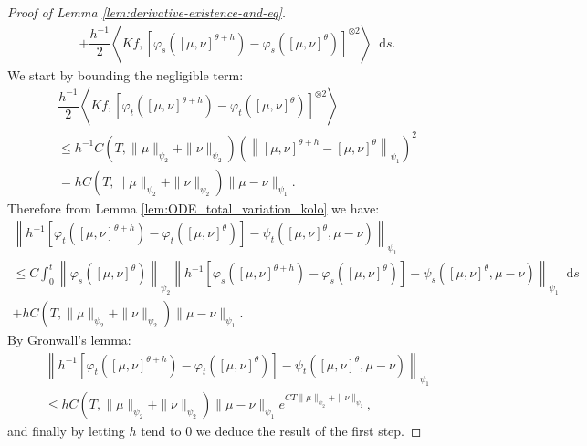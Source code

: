 \documentclass[11pt,a4paper]{article}
\newcommand{\brac}[1]{\left\langle#1\right\rangle}
\newcommand{\dd}{\mathop{}\!\mathrm{d}}
\begin{document}
\begin{proof}[Proof of Lemma \ref{lem:derivative-existence-and-eq}]
\begin{multline*}
        + \dfrac{h^{-1}}{2}\brac{Kf, \left[\varphi_s\left(\left[\mu,\nu \right]^{\theta+h} \right) - \varphi_s\left(\left[\mu,\nu \right]^{\theta} \right)\right]^{\otimes 2}} \dd s.
    \end{multline*}
    We start by bounding the negligible term:
    \begin{multline*}
        \dfrac{h^{-1}}{2}\brac{Kf, \left[\varphi_t\left(\left[\mu,\nu \right]^{\theta+h} \right) - \varphi_t\left(\left[\mu,\nu \right]^{\theta} \right)\right]^{\otimes 2}} \\
        \leq h^{-1}C\left(T,\|\mu\|_{\psi_2} + \|\nu\|_{\psi_2}\right)\left(\left\| \left[\mu,\nu \right]^{\theta+h} - \left[\mu,\nu \right]^{\theta}\right\|_{\psi_1}\right)^2\\
        = hC\left(T,\|\mu\|_{\psi_2} + \|\nu\|_{\psi_2}\right)\|\mu - \nu\|_{\psi_1}.
    \end{multline*}
    Therefore from Lemma \ref{lem:ODE_total_variation_kolo} we have:
    \begin{multline*}
        \left\| h^{-1}\left[\varphi_t\left(\left[\mu,\nu \right]^{\theta+h} \right) - \varphi_t\left(\left[\mu,\nu \right]^{\theta} \right) \right] - \psi_t\left(\left[\mu,\nu \right]^\theta,\mu-\nu\right)\right\|_{\psi_1} \\
        \leq C\int_0^t \left\| \varphi_s\left(\left[\mu,\nu \right]^{\theta} \right) \right\|_{\psi_2}\left\| h^{-1}\left[\varphi_s\left(\left[\mu,\nu \right]^{\theta+h} \right) - \varphi_s\left(\left[\mu,\nu \right]^{\theta} \right) \right] - \psi_s\left(\left[\mu,\nu \right]^\theta,\mu-\nu\right)\right\|_{\psi_1} \dd s\\
        + hC\left(T,\|\mu\|_{\psi_2} + \|\nu\|_{\psi_2}\right)\|\mu - \nu\|_{\psi_1}.
    \end{multline*}
    By Gronwall's lemma:
    \begin{multline*}
        \left\| h^{-1}\left[\varphi_t\left(\left[\mu,\nu \right]^{\theta+h} \right) - \varphi_t\left(\left[\mu,\nu \right]^{\theta} \right) \right] - \psi_t\left(\left[\mu,\nu \right]^\theta,\mu-\nu\right)\right\|_{\psi_1} \\
        \leq hC\left(T,\|\mu\|_{\psi_2} + \|\nu\|_{\psi_2}\right)\|\mu - \nu\|_{\psi_1} e^{CT\|\mu\|_{\psi_2} + \|\nu\|_{\psi_2}},
    \end{multline*}
    and finally by letting $h$ tend to $0$ we deduce the result of the first step.
    

\end{proof}
\end{document}
